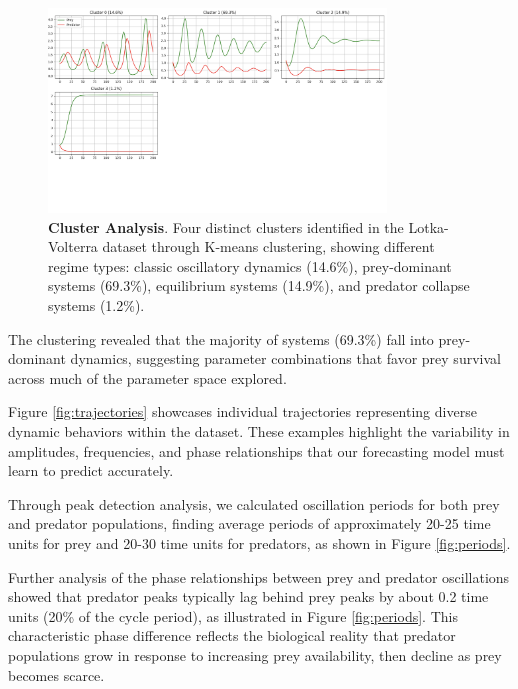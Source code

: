 \documentclass{article}
\begin{document}
\begin{figure}[H]
    \centering
    \includegraphics[width=0.8\textwidth]{cluster_representatives}
    \caption{\textbf{Cluster Analysis}. Four distinct clusters identified in the Lotka-Volterra dataset through K-means clustering, showing different regime types: classic oscillatory dynamics (14.6\%), prey-dominant systems (69.3\%), equilibrium systems (14.9\%), and predator collapse systems (1.2\%).}
    \label{fig:clusters}
\end{figure}

The clustering revealed that the majority of systems (69.3\%) fall into prey-dominant dynamics, suggesting parameter combinations that favor prey survival across much of the parameter space explored.

Figure \ref{fig:trajectories} showcases individual trajectories representing diverse dynamic behaviors within the dataset. These examples highlight the variability in amplitudes, frequencies, and phase relationships that our forecasting model must learn to predict accurately.

Through peak detection analysis, we calculated oscillation periods for both prey and predator populations, finding average periods of approximately 20-25 time units for prey and 20-30 time units for predators, as shown in Figure \ref{fig:periods}.

Further analysis of the phase relationships between prey and predator oscillations showed that predator peaks typically lag behind prey peaks by about 0.2 time units (20\% of the cycle period), as illustrated in Figure \ref{fig:periods}. This characteristic phase difference reflects the biological reality that predator populations grow in response to increasing prey availability, then decline as prey becomes scarce.
\end{document}
